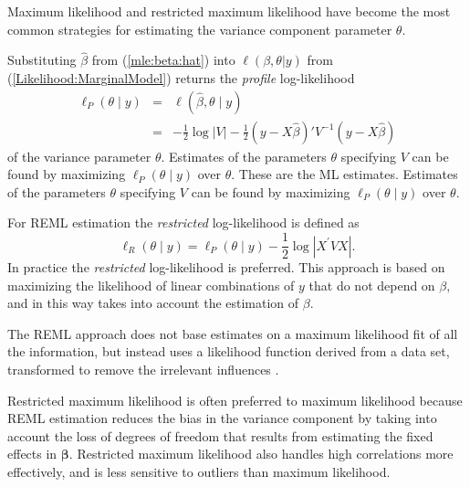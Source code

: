 \documentclass[12pt, a4paper]{report}
\theoremstyle{plain}
\theoremstyle{definition}
\theoremstyle{remark}
\begin{document}
Maximum likelihood and restricted maximum likelihood have become the most common strategies for estimating the variance component parameter $\theta.$ 

Substituting $\hat{\beta}$ from (\ref{mle:beta:hat}) into $\ell(\beta, \theta|y)$ from (\ref{Likelihood:MarginalModel}) returns the \emph{profile} log-likelihood
\begin{eqnarray*}
	\ell_P(\theta \mid y) &=& \ell(\hat{\beta}, \theta \mid y) \\
	&=& -\frac{1}{2} \log |V| -\frac{1}{2}(y - X \hat{\beta})'V^{-1}(y - X \hat{\beta})
\end{eqnarray*}
of the variance parameter $\theta.$ Estimates of the parameters $\theta$ specifying $V$ can be found by maximizing $\ell_P(\theta \mid y)$ over $\theta.$ These are the ML estimates. Estimates of the parameters $\theta$ specifying $V$ can be found by maximizing $\ell_P(\theta \mid y)$ over $\theta.$ 

For REML estimation the \emph{restricted} log-likelihood is defined as
\[
\ell_R(\theta \mid y) =
\ell_P(\theta \mid y) -\frac{1}{2} \log |X^\prime VX |.
\]
In practice the \emph{restricted} log-likelihood is preferred. This approach is based on maximizing the likelihood of linear combinations of $y$ that do not depend on $\beta,$ and in this way takes into account the estimation of $\beta.$







The REML approach does not base estimates on a maximum likelihood fit of all the information, but instead uses a likelihood function derived from a data set, transformed to remove the irrelevant influences \citep{REMLDefine}.

Restricted maximum likelihood is often preferred to maximum likelihood because REML estimation reduces the bias in the variance component by taking into account the loss of degrees of freedom that results
from estimating the fixed effects in $\boldsymbol{\beta}$. Restricted maximum likelihood also handles high correlations more effectively, and is less sensitive to outliers than maximum likelihood. 
\end{document}
